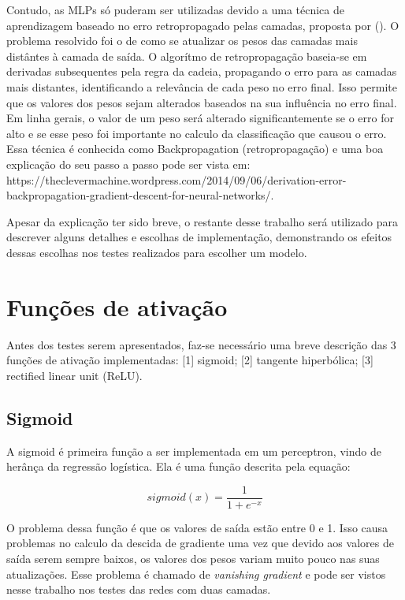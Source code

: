 \documentclass[conference]{IEEEtran}
\begin{document}
  Contudo, as MLPs só puderam ser utilizadas devido a uma técnica de aprendizagem baseado no erro retropropagado pelas camadas, proposta por \citeauthor{rumelhart1986learning} (\citeyear{rumelhart1986learning}). O problema resolvido foi o de como se atualizar os pesos das camadas mais distântes à camada de saída. O algorítmo de retropropagação baseia-se em derivadas subsequentes pela regra da cadeia, propagando o erro para as camadas mais distantes, identificando a relevância de cada peso no erro final. Isso permite que os valores dos pesos sejam alterados baseados na sua influência no erro final. Em linha gerais, o valor de um peso será alterado significantemente se o erro for alto e se esse peso foi importante no calculo da classificação que causou o erro. Essa técnica é conhecida como Backpropagation (retropropagação) e uma boa explicação do seu passo a passo pode ser vista em: https://theclevermachine.wordpress.com/2014/09/06/derivation-error-backpropagation-gradient-descent-for-neural-networks/.
  
  Apesar da explicação ter sido breve, o restante desse trabalho será utilizado para descrever alguns detalhes e escolhas de implementação, demonstrando os efeitos dessas escolhas nos testes realizados para escolher um modelo.
  
\section{Funções de ativação}
	Antes dos testes serem apresentados, faz-se necessário uma breve descrição das 3 funções de ativação implementadas: [1] sigmoid; [2] tangente hiperbólica; [3] rectified linear unit (ReLU).
	 
\subsection{Sigmoid}

	A sigmoid é primeira função a ser implementada em um perceptron, vindo de herânça da regressão logística. Ela é uma função descrita pela equação: 

\begin{equation}
sigmoid(x) = \dfrac{1}{1 + e^{-x}}
\end{equation}	

	O problema dessa função é que os valores de saída estão entre 0 e 1. Isso causa problemas no calculo da descida de gradiente uma vez que devido aos valores de saída serem sempre baixos, os valores dos pesos variam muito pouco nas suas atualizações. Esse problema é chamado de \textit{vanishing gradient} e pode ser vistos nesse trabalho nos testes das redes com duas camadas.
	
\end{document}
